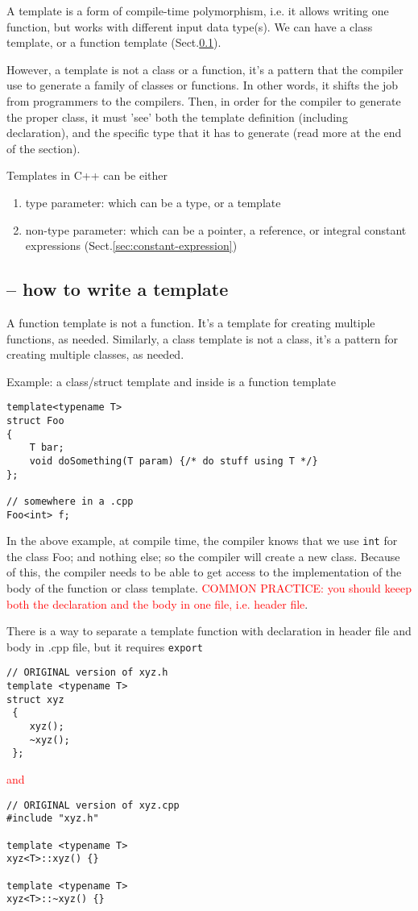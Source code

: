 A template is a form of compile-time polymorphism, i.e. it allows writing one
function, but works with different input data type(s). We can have a class
template, or a function template (Sect.\ref{sec:template-how-to-use}).

However, a template is not a class or a function, it's a pattern that the
compiler use to generate a family of classes or functions.  In other words, it
shifts the job from programmers to the compilers. Then, in order for the
compiler to generate the proper class, it must 'see' both the template
definition (including declaration), and the specific type that it has to
generate (read more at the end of the section).


Templates in C++ can be either
\begin{enumerate}
  \item type parameter: which can be a type, or a template
  \item non-type parameter: which can be a pointer, a reference, or integral
  constant expressions (Sect.\ref{sec:constant-expression})
\end{enumerate}

\subsection{-- how to write a template}
\label{sec:template-how-to-use}


A function template is not a function. It's a template for creating
multiple functions, as needed. Similarly, a class template is not a class, it's
a pattern for creating multiple classes, as needed.

Example: a class/struct template and inside is a function template
\begin{lstlisting}
template<typename T>
struct Foo
{
    T bar;
    void doSomething(T param) {/* do stuff using T */}
};

// somewhere in a .cpp
Foo<int> f; 
\end{lstlisting}

In the above example, at compile time, the compiler knows that we use \verb!int!
for the class Foo; and nothing else; so the compiler will create a new class.
Because of this, the compiler needs to be able to get access to the
implementation of the body of the function or class template.
\textcolor{red}{COMMON PRACTICE: you should keeep both the declaration
and the body in one file, i.e. header file}. 


There is a way to separate a template function with declaration in header file
and body in .cpp file, but it requires \verb!export! 
\begin{verbatim}
// ORIGINAL version of xyz.h
template <typename T>
struct xyz
 {
    xyz();
    ~xyz();
 };
\end{verbatim}
\textcolor{red}{and}
\begin{verbatim}
// ORIGINAL version of xyz.cpp
#include "xyz.h"

template <typename T>
xyz<T>::xyz() {}

template <typename T>
xyz<T>::~xyz() {}
\end{verbatim}

